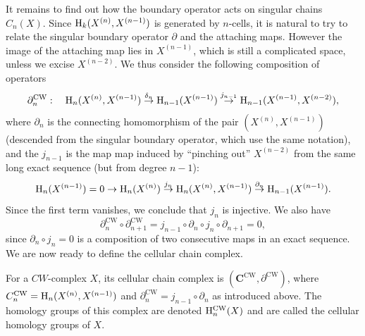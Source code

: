 It remains to find out how the boundary operator acts on singular chains $C_n(X)$. Since $\mathrm{H}_k(X^{(n)},X^{(n-1)})$ is generated by $n$-cells, it is natural to try to relate the singular boundary operator $\partial$ and the attaching maps. However the image of the attaching map lies in $X^{(n-1)}$, which is still a complicated space, unless we excise $X^{(n-2)}$. We thus consider the following composition of operators
\[\partial^{\mathrm{CW}}_n:\quad \mathrm{H}_n(X^{(n)},X^{(n-1)})\overset{\delta_n}{\to}\mathrm{H}_{n-1}(X^{(n-1)})\overset{j_{n-1}}{\to} \mathrm{H}_{n-1}(X^{(n-1)},X^{(n-2)}),\]
where $\partial_n$ is the connecting homomorphism of the pair $(X^{(n)},X^{(n-1)})$ (descended from the singular boundary operator, which use the same notation), and the $j_{n-1}$ is the map map induced by ``pinching out'' $X^{(n-2)}$ from the same long exact sequence (but from degree $n-1$):
\[\mathrm{H}_n(X^{(n-1)})=0\to \mathrm{H}_n(X^{(n)})\overset{j_n}{\to}\mathrm{H}_n(X^{(n)},X^{(n-1)})\overset{\partial_n}{\to}\mathrm{H}_{n-1}(X^{(n-1)}).\]
Since the first term vanishes, we conclude that $j_n$ is injective. We also have
\[\partial^{\mathrm{CW}}_n\circ \partial^{\mathrm{CW}}_{n+1}=j_{n-1}\circ \partial_n\circ j_n\circ \partial_{n+1}=0,\]
since $\partial_n\circ j_n=0$ is a composition of two consecutive maps in an exact sequence. We are now ready to define the cellular chain complex.

\begin{defn}
    For a $CW$-complex $X$, its cellular chain complex is $(\bm{C}^{\mathrm{CW}},\partial^{\mathrm{CW}})$, where $C_n^{\mathrm{CW}}=\mathrm{H}_n(X^{(n)},X^{(n-1)})$ and $\partial^{\mathrm{CW}}_n=j_{n-1}\circ \partial_n$ as introduced above. The homology groups of this complex are denoted $\mathrm{H}_n^{\mathrm{CW}}(X)$ and are called the cellular homology groups of $X$.
\end{defn}

